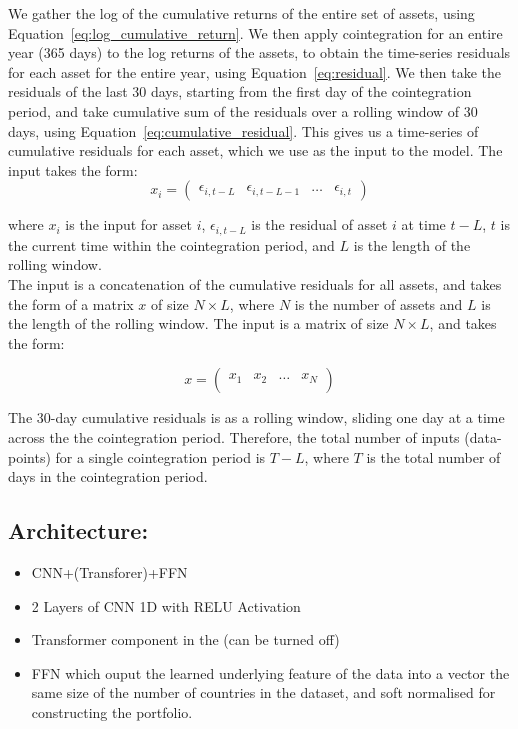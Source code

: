 \documentclass[12pt]{article}
\begin{document}
We gather the log of the cumulative returns of the entire set of assets, using Equation~\ref{eq:log_cumulative_return}. We then apply cointegration for an entire year (365 days) to the log returns of the assets, to obtain the time-series residuals for each asset for the entire year, using Equation~\ref{eq:residual}. We then take the residuals of the last 30 days, starting from the first day of the cointegration period, and take cumulative sum of the residuals over a rolling window of 30 days, using Equation~\ref{eq:cumulative_residual}. This gives us a time-series of cumulative residuals for each asset, which we use as the input to the model. The input takes the form:
\begin{equation}
    x_i = \begin{pmatrix}
        \epsilon_{i,t-L} & \epsilon_{i,t-L-1} & \ldots & \epsilon_{i,t}
    \end{pmatrix}
    \label{eq:input_single_asset}
\end{equation}

where $x_i$ is the input for asset $i$, $\epsilon_{i,t-L}$ is the residual of asset $i$ at time $t-L$, $t$ is the current time within the cointegration period, and $L$ is the length of the rolling window. 
\\
The input is a concatenation of the cumulative residuals for all assets, and takes the form of a matrix $x$ of size $N \times L$, where $N$ is the number of assets and $L$ is the length of the rolling window. The input is a matrix of size $N \times L$, and takes the form:

\begin{equation}
    x = \begin{pmatrix}
        x_1 & x_2 & \ldots & x_N \\
    \end{pmatrix}
    \label{eq:input_matrix}
\end{equation}

The 30-day cumulative residuals is as a rolling window, sliding one day at a time across the the cointegration period. Therefore, the total number of inputs (data-points) for a single cointegration period is $T - L$, where $T$ is the total number of days in the cointegration period.





\subsection*{Architecture:}
\begin{itemize}
    \item CNN+(Transforer)+FFN
    \item 2 Layers of CNN 1D with RELU Activation
    \item Transformer component in the  (can be turned off)
    \item FFN which ouput the learned underlying feature of the data into a vector the same size of the number of countries in the dataset, and soft normalised for constructing the portfolio.
\end{itemize}
\end{document}
